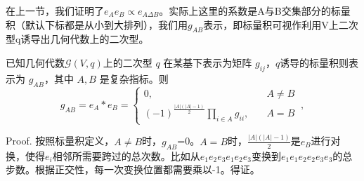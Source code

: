 在上一节，我们证明了$e_Ae_B\propto e_{A\Delta B}$。实际上这里的系数是A与B交集部分的标量积（默认下标都是从小到大排列），我们用$g_{AB}$表示，即标量积可视作利用V上二次型q诱导出几何代数上的二次型。
\begin{theorem}{}
已知几何代数$\mathcal {G}(V, q)$上的二次型 $q$ 在某基下表示为矩阵 $g_{ij}$，$q $诱导的标量积则表示为 $g_{AB}$，其中 $A,B$ 是复杂指标。则
\begin{equation}
g_{A B}=e_A*e_B=\left\{\begin{aligned}
0,\quad & A \neq B \\
(-1)^{\frac{|A|(|A|-1)}{2}} \prod_{i \in A} g_{i i}, \quad& A=B
\end{aligned}\right.~,
\end{equation}
\end{theorem}

Proof. 按照标量积定义，$A \neq B$时，$g_{AB}$=0。$A = B$时，$\frac{|A|(|A|-1)}{2}$是$e_B$进行对换，使得$e_i$相邻所需要跨过的总次数。比如从$e_1e_2e_3e_1e_2e_3$变换到$e_1e_1e_2e_2e_3e_3$的总步数。根据正交性，每一次变换位置都需要乘以-1。得证。

